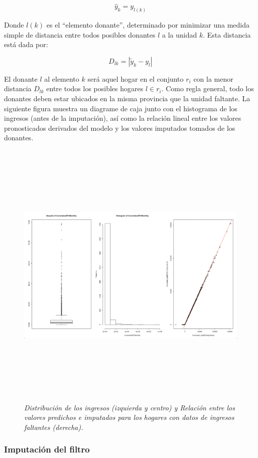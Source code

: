 \documentclass[
  12pt,
  spanish,
]{book}
\begin{document}
\[\hat{y}_k = y_{l(k)}\]

Donde \(l(k)\) es el ``elemento donante'', determinado por minimizar una medida simple de distancia entre todos posibles donantes \(l\) a la unidad \(k\). Esta distancia está dada por:

\[
D_{lk} = |\tilde y_k - y_l|
\]

El donante \(l\) al elemento \(k\) será aquel hogar en el conjunto \(r_i\) con la menor distancia \(D_{lk}\) entre todos los posibles hogares \(l\in r_i\). Como regla general, todo los donantes deben estar ubicados en la misma provincia que la unidad faltante. La siguiente figura muestra un diagrame de caja junto con el histograma de los ingresos (antes de la imputación), así como la relación lineal entre los valores pronosticados derivados del modelo y los valores imputados tomados de los donantes.

\begin{figure}
\centering
\includegraphics[width=\textwidth,height=5.20833in]{Pics/10.png}
\caption{\emph{Distribución de los ingresos (izquierda y centro) y Relación entre los valores predichos e imputados para los hogares con datos de ingresos faltantes (derecha).}}
\end{figure}

\hypertarget{imputaciuxf3n-del-filtro}{%
\subsubsection*{Imputación del filtro}\label{imputaciuxf3n-del-filtro}}
\end{document}
